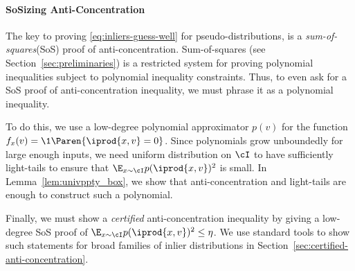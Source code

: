 \paragraph{SoSizing Anti-Concentration} The key to proving \eqref{eq:inliers-guess-well} for pseudo-distributions, is a \emph{sum-of-squares}(SoS) proof of anti-concentration. Sum-of-squares (see Section~\ref{sec:preliminaries}) is a restricted system for proving polynomial inequalities subject to polynomial inequality constraints. Thus, to even ask for a SoS proof of anti-concentration inequality, we must phrase it as a polynomial inequality. 

To do this, we use a low-degree polynomial approximator $p(v)$ for the function $f_x(v) = \1\Paren{ \iprod{x,v} =0}$. Since  polynomials grow unboundedly for large enough inputs, we need uniform distribution on $\cI$ to have sufficiently light-tails to ensure that $\E_{x \sim \cI} p(\iprod{x,v})^2$ is small. In Lemma~\ref{lem:univppty_box}, we show that anti-concentration and light-tails are enough to construct such a polynomial. 

Finally, we must show a \emph{certified} anti-concentration inequality by giving a low-degree SoS proof of $\E_{x \sim \cI} p(\iprod{x,v})^2 \leq \eta$. We use standard tools to show such statements for broad families of inlier distributions in Section~\ref{sec:certified-anti-concentration}.





